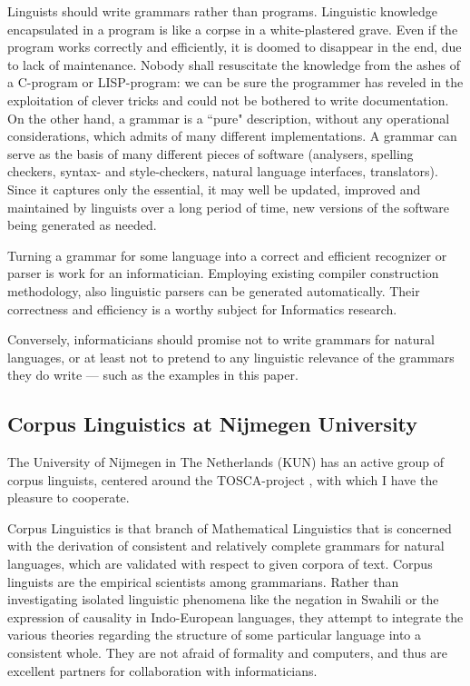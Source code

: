 Linguists should write grammars rather than programs. Linguistic knowledge
encapsulated in a program is like a corpse in a white-plastered grave.
Even if the program works correctly and efficiently, it is doomed to disappear
in the end, due to lack of maintenance. Nobody shall resuscitate the knowledge
from the ashes of a C-program or LISP-program: we can be sure the programmer
has reveled in the exploitation of clever tricks and could not be bothered
to write documentation. On the other hand, a grammar
is a ``pure" description, without any operational considerations,
which admits of many different implementations. A grammar can serve as the
basis of many different pieces of software (analysers, spelling checkers,
syntax- and style-checkers, natural language interfaces,
translators). Since it captures only the essential, it may well be updated,
improved and maintained by linguists over a long period of time,
new versions of the software being generated as needed.

Turning a grammar for some language into a correct and efficient recognizer or
parser is work for an informatician. Employing existing compiler construction
methodology, also linguistic parsers can be generated automatically.
Their correctness and efficiency is a worthy subject for Informatics research.

Conversely, informaticians should promise not to write grammars
for natural languages, or at least
not to pretend to any linguistic relevance of the grammars they do write ---
such as the examples in this paper.

\subsection{Corpus Linguistics at Nijmegen University}
The University of Nijmegen in The Netherlands (KUN) has an active group of
corpus linguists, centered around the TOSCA-project
\cite{tosca:basis,tosca:manual}, with which I have the pleasure to cooperate.

Corpus Linguistics is that branch of Mathematical Linguistics that is
concerned with the derivation of consistent and relatively complete
grammars for natural languages, which are validated with respect to
given corpora of text. Corpus linguists are the empirical scientists among
grammarians. Rather than investigating isolated linguistic phenomena
like the negation in Swahili or the expression of causality in
Indo-European languages, they attempt to integrate the various theories
regarding the structure of some particular language into a consistent whole.
They are not afraid of formality and computers, and thus are excellent
partners for collaboration with informaticians.

